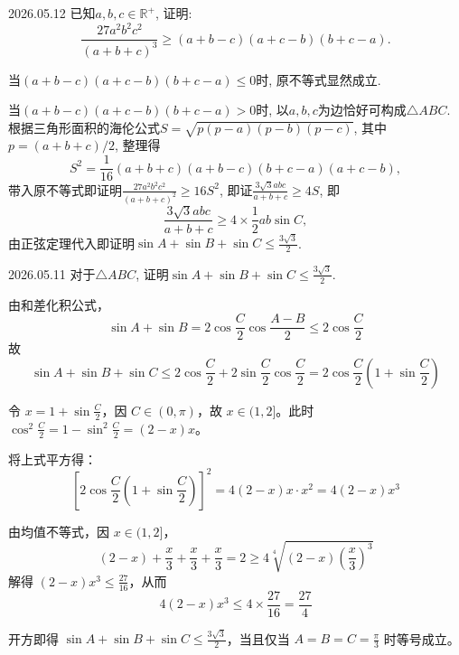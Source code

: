 \documentclass{dayMath}
\begin{document}
\begin{problem}{2026.05.12}
已知\(a,b,c\in\mathbb{R}^+\), 证明:
\[\frac{27a^2b^2c^2}{(a+b+c)^3}\geq (a+b-c)(a+c-b)(b+c-a).\]
\begin{solution}
当\((a+b-c)(a+c-b)(b+c-a)\leq 0\)时, 原不等式显然成立.

当\((a+b-c)(a+c-b)(b+c-a)> 0\)时, 以\(a,b,c\)为边恰好可构成\(\triangle ABC\). 根据三角形面积的海伦公式\(S=\sqrt{p(p-a)(p-b)(p-c)}\), 其中\(p=(a+b+c)/2\), 整理得\[S^2=\frac{1}{16}(a+b+c)(a+b-c)(b+c-a)(a+c-b),\]
带入原不等式即证明\(\frac{27a^2b^2c^2}{(a+b+c)^2}\geq 16S^2\), 即证\(\frac{3\sqrt{3}abc}{a+b+c}\geq 4S\), 即\[\frac{3\sqrt{3}abc}{a+b+c}\geq4\times\frac{1}{2}ab\sin C,\]
由正弦定理代入即证明\(\sin A+\sin B+\sin C\leq\frac{3\sqrt{3}}{2}\).
\end{solution}
\end{problem}
\begin{problem}{2026.05.11}
对于\(\triangle ABC\), 证明\(\sin A+\sin B+\sin C\leq\frac{3\sqrt{3}}{2}\).
\begin{solution}
由和差化积公式，
$$ \sin A + \sin B = 2\cos\frac{C}{2}\cos\frac{A-B}{2} \le 2\cos\frac{C}{2} $$
故
$$ \sin A + \sin B + \sin C \le 2\cos\frac{C}{2} + 2\sin\frac{C}{2}\cos\frac{C}{2} = 2\cos\frac{C}{2}\left(1+\sin\frac{C}{2}\right) $$

令 $x = 1+\sin\frac{C}{2}$，因 $C \in (0, \pi)$，故 $x \in (1, 2]$。此时 $\cos^2\frac{C}{2} = 1-\sin^2\frac{C}{2} = (2-x)x$。

将上式平方得：
$$ \left[2\cos\frac{C}{2}\left(1+\sin\frac{C}{2}\right)\right]^2 = 4(2-x)x \cdot x^2 = 4(2-x)x^3 $$

由均值不等式，因 $x \in (1, 2]$，
$$ (2-x) + \frac{x}{3} + \frac{x}{3} + \frac{x}{3} = 2 \ge 4\sqrt[4]{(2-x)\left(\frac{x}{3}\right)^3} $$
解得 $(2-x)x^3 \le \frac{27}{16}$，从而
$$ 4(2-x)x^3 \le 4 \times \frac{27}{16} = \frac{27}{4} $$

开方即得 $\sin A + \sin B + \sin C \le \frac{3\sqrt{3}}{2}$，当且仅当 $A=B=C=\frac{\pi}{3}$ 时等号成立。
\end{solution}
\end{problem}
\end{document}

